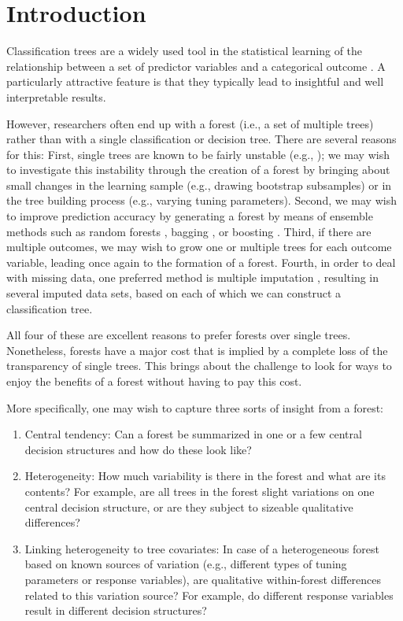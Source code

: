 \section{Introduction}
Classification trees are a widely used tool in the statistical learning of the relationship between a set of predictor variables and a categorical outcome \citep{Breiman1984, Quinlan1986}. A particularly attractive feature is that they typically lead to insightful and well interpretable results.

However, researchers often end up with a forest (i.e., a set of multiple trees) rather than with a single classification or decision tree. There are several reasons for this: First, single trees are known to be fairly unstable (e.g., \citet{philipp2016, philipp2018}); we may wish to investigate this instability through the creation of a forest by bringing about small changes in the learning sample (e.g., drawing bootstrap subsamples) or in the tree building process (e.g., varying tuning parameters)\citep{Breiman1996a, Strobl2009, Turney1995}. Second, we may wish to improve prediction accuracy \citep{Bauer1999, Dietterich2000, Hastie2009, skurichina2002} by generating a forest by means of ensemble methods such as random forests \citep{Breiman2001}, bagging \citep{Breiman1996b}, or boosting \citep{Freund1997}. Third, if there are multiple outcomes, we may wish to grow one or multiple trees for each outcome variable, leading once again to the formation of a forest. Fourth, in order to deal with missing data, one preferred method is multiple imputation \citep{Rubin1987}, resulting in several imputed data sets, based on each of which we can construct a classification tree.

All four of these are excellent reasons to prefer forests over single trees. Nonetheless, forests have a major cost that is implied by a complete loss of the transparency of single trees. This brings about the challenge to look for ways to enjoy the benefits of a forest without having to pay this cost.

More specifically, one may wish to capture three sorts of insight from a forest:
\begin{enumerate}
\item{Central tendency: Can a forest be summarized in one or a few central decision structures and how do these look like?}
\item{Heterogeneity: How much variability is there in the forest and what are its contents? For example, are all trees in the forest slight variations on one central decision structure, or are they subject to sizeable qualitative differences?}
\item{Linking heterogeneity to tree covariates: In case of a heterogeneous forest based on known sources of variation (e.g., different types of tuning parameters or response variables), are qualitative within-forest differences related to this variation source? For example, do different response variables result in different decision structures?}
\end{enumerate}

